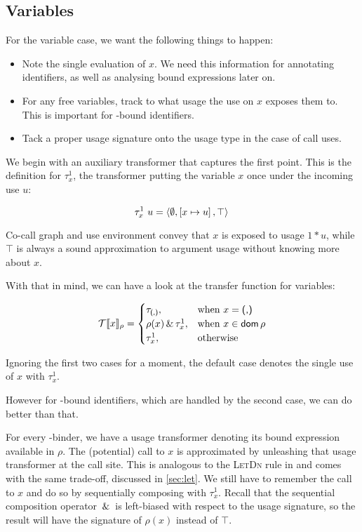 \subsection{Variables}\label{sec:var}

For the variable case, we want the following things to happen:

\begin{itemize}
\item Note the single evaluation of $x$. We need this information for annotating identifiers, as well as analysing bound expressions later on.
\item For any free variables, track to what usage the use on $x$ exposes them to. This is important for -bound identifiers.
\item Tack a proper usage signature onto the usage type in the case of call uses.
\end{itemize}

We begin with an auxiliary transformer that captures the first point. 
This is the definition for $\tau^1_x$, the transformer putting the variable $x$ once under the incoming use $u$:

\[
\tau^1_x~u = \left\langle{}\emptyset,\left[x\mapsto u\right],\top\right\rangle{}
\]

Co-call graph and use environment convey that $x$ is exposed to usage $1*u$, while $\top$ is always a sound approximation to argument usage without knowing more about $x$.

With that in mind, we can have a look at the transfer function for variables:

\[
\mathcal{T}\llbracket x\rrbracket_{\rho} =
  \begin{cases}
    \tau_{\text{\textsf{(,)}}}, & \text{when } x = \text{\textsf{(,)}} \\
    \rho(x) \,\&\, \tau^1_x, & \text{when } x\in \mathsf{dom}\,\rho \\
    \tau^1_x, & \text{otherwise}
  \end{cases}
\]

Ignoring the first two cases for a moment, the default case denotes the single use of $x$ with $\tau^1_x$.

However for -bound identifiers, which are handled by the second case, we can do better than that. 

For every -binder, we have a usage transformer denoting its bound expression available in $\rho$.
The (potential) call to $x$ is approximated by unleashing that usage transformer at the call site.
This is analogous to the \textsc{LetDn} rule in \textcite{card} and comes with the same trade-off, discussed in \cref{sec:let}.
We still have to remember the call to $x$ and do so by sequentially composing with $\tau^1_x$.
Recall that the sequential composition operator $\,\&\,$ is left-biased with respect to the usage signature, so the result will have the signature of $\rho(x)$ instead of $\top$.

